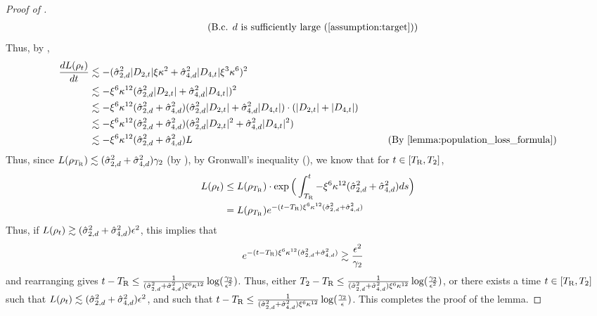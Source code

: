 \begin{proof}[Proof of ]
\begin{align}
& \tag{B.c. $d$ is sufficiently large (\Cref{assumption:target})}
\end{align}
Thus, by ,
\begin{align}
\frac{dL(\rho_t)}{dt}
& \lesssim - (\sigmaCoeffTwo^2 |D_{2, t}| \xi \kappa^2 + \sigmaCoeffFour^2 |D_{4, t}| \xi^3 \kappa^6 )^2 \\
& \lesssim -\xi^6 \kappa^{12} (\sigmaCoeffTwo^2 |D_{2, t}| + \sigmaCoeffFour^2 |D_{4, t}|)^2 \\
& \lesssim - \xi^6 \kappa^{12} (\sigmaCoeffTwo^2 + \sigmaCoeffFour^2) (\sigmaCoeffTwo^2 |D_{2, t}| + \sigmaCoeffFour^2 |D_{4, t}|) \cdot (|D_{2, t}| + |D_{4, t}|) \\
& \lesssim -\xi^6 \kappa^{12} (\sigmaCoeffTwo^2 + \sigmaCoeffFour^2) (\sigmaCoeffTwo^2 |D_{2, t}|^2 + \sigmaCoeffFour^2 |D_{4, t}|^2) \\
& \lesssim -\xi^6 \kappa^{12} (\sigmaCoeffTwo^2 + \sigmaCoeffFour^2) L
& \tag{By \Cref{lemma:population_loss_formula}}
\end{align}
Thus, since $L(\rho_{{T_{\textup{R}}}}) \lesssim (\hat{\sigma}_{2, d}^2 + \hat{\sigma}_{4, d}^2) \gamma_2$ (by ), by Gronwall's inequality (), we know that for $t \in [{T_{\textup{R}}}, T_2]$,
\begin{align}
L(\rho_t)
& \leq L(\rho_{{T_{\textup{R}}}}) \cdot \exp\Big(\int_{{T_{\textup{R}}}}^t -\xi^6 \kappa^{12} (\hat{\sigma}_{2, d}^2 + \hat{\sigma}_{4, d}^2) ds\Big) \\
& = L(\rho_{{T_{\textup{R}}}}) e^{-(t - {T_{\textup{R}}}) \xi^6 \kappa^{12} (\hat{\sigma}_{2, d}^2 + \hat{\sigma}_{4, d}^2)}
\end{align}
Thus, if $L(\rho_t) \gtrsim (\hat{\sigma}_{2, d}^2 + \hat{\sigma}_{4, d}^2) \epsilon^2$, this implies that
\begin{align}
e^{-(t - {T_{\textup{R}}}) \xi^6 \kappa^{12} (\hat{\sigma}_{2, d}^2 + \hat{\sigma}_{4, d}^2)} 
& \gtrsim \frac{\epsilon^2}{\gamma_2}
\end{align}
and rearranging gives $t - {T_{\textup{R}}} \leq \frac{1}{(\hat{\sigma}_{2, d}^2 + \hat{\sigma}_{4, d}^2) \xi^6 \kappa^{12}} \log(\frac{\gamma_2}{\epsilon^2})$. Thus, either $T_2 - {T_{\textup{R}}} \leq \frac{1}{(\hat{\sigma}_{2, d}^2 + \hat{\sigma}_{4, d}^2) \xi^6 \kappa^{12}} \log(\frac{\gamma_2}{\epsilon^2})$, or there exists a time $t \in [{T_{\textup{R}}}, T_2]$ such that $L(\rho_t) \lesssim (\hat{\sigma}_{2, d}^2 + \hat{\sigma}_{4, d}^2) \epsilon^2$, and such that $t - {T_{\textup{R}}} \leq \frac{1}{(\hat{\sigma}_{2, d}^2 + \hat{\sigma}_{4, d}^2) \xi^6 \kappa^{12}} \log (\frac{\gamma_2}{\epsilon})$. This completes the proof of the lemma.
\end{proof}

